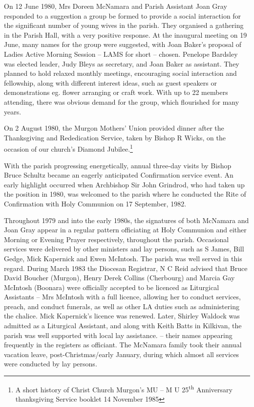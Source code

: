 On 12 June 1980, Mrs Doreen McNamara and Parish Assistant Joan Gray responded to a suggestion a group be formed to provide a social interaction for the significant number of young wives in the parish. They organised a gathering in the Parish Hall, with a very positive response. At the inaugural meeting on 19 June, many names for the group were suggested, with Joan Baker's proposal of Ladies Active Morning Session -- LAMS for short -- chosen. Penelope Bardsley was elected leader, Judy Bleys as secretary, and Joan Baker as assistant. They planned to hold relaxed monthly meetings, encouraging social interaction and fellowship, along with different interest ideas, such as guest speakers or demonstrations eg. flower arranging or craft work. With up to 22 members attending, there was obvious demand for the group, which flourished for many years.



On 2 August 1980, the Murgon Mothers' Union provided dinner after the Thanksgiving and Rededication Service, taken by Bishop R Wicks, on the occasion of our church's Diamond Jubilee.\footnote{A short history of Christ Church Murgon's MU -- M U 25\textsuperscript{th} Anniversary thanksgiving Service booklet 14 November 1985}


With the parish progressing energetically, annual three-day visits by Bishop Bruce Schultz became an eagerly anticipated Confirmation service event. An early highlight occurred when Archbishop Sir John Grindrod, who had taken up the position in 1980, was welcomed to the parish where he conducted the Rite of Confirmation with Holy Communion on 17 September, 1982.



Throughout 1979 and into the early 1980s, the signatures of both McNamara and Joan Gray appear in a regular pattern officiating at Holy Communion and either Morning or Evening Prayer respectively, throughout the parish. Occasional services were delivered by other ministers and lay persons, such as S James, Bill Gedge, Mick Kapernick and Ewen McIntosh. The parish was well served in this regard. During March 1983 the Diocesan Registrar, N C Reid advised that Bruce David Boucher (Murgon), Henry Derek Collins (Cherbourg) and Marcia Gay McIntosh (Boonara) were officially accepted to be licenced as Liturgical Assistants -- Mrs McIntosh with a full licence, allowing her to conduct services, preach, and conduct funerals, as well as other LA duties such as administering the chalice. Mick Kapernick's licence was renewed. Later, Shirley Waldock was admitted as a Liturgical Assistant, and along with Keith Batts in Kilkivan, the parish was well supported with local lay assistance. -- their names appearing frequently in the registers as officiant. The McNamara family took their annual vacation leave, post-Christmas/early January, during which almost all services were conducted by lay persons.



